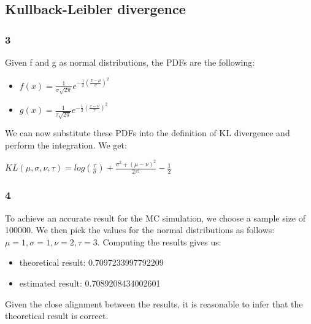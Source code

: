 \subsection{Kullback-Leibler divergence}
\subsubsection{3}
Given f and g as normal distributions, the PDFs are the following:
\begin{itemize}
    \item $f(x) = \frac{1}{\sigma \sqrt{2\pi}} e^{-\frac{1}{2}(\frac{x - \mu}{\sigma})^2}$
    \item $g(x) = \frac{1}{\tau \sqrt{2\pi}} e^{-\frac{1}{2}(\frac{x - \nu}{\tau})^2}$
\end{itemize}

We can now substitute these PDFs into the definition of KL divergence and perform the integration. We get: \\
\begin{center}
    $KL(\mu, \sigma, \nu, \tau) = log(\frac{\tau}{\sigma}) + \frac{\sigma^2 +  (\mu - \nu)^2}{2\tau^2} - \frac{1}{2}$
\end{center}

\subsubsection{4}
To achieve an accurate result for the MC simulation, we choose a sample size of 100000. We then pick the values for the normal distributions as follows: $\mu=1, \sigma=1, \nu=2, \tau=3$. Computing the results gives us:
\begin{itemize}
    \item theoretical result: 0.7097233997792209
    \item estimated result: 0.7089208434002601
\end{itemize}

Given the close alignment between the results, it is reasonable to infer that the theoretical result is correct.